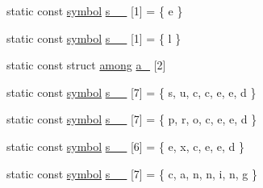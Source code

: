 \begin{DoxyCompactItemize}
static const \mbox{\hyperlink{namespaceirk_1_1porter2_afd04c4eb58a1dabcf8f3ab2d7e9f9ed5}{symbol}} \mbox{\hyperlink{namespaceirk_1_1porter2_a11dd59c08c3cf44465ad15ff372e47f8}{s\+\_\+\_}} \mbox{[}1\mbox{]} = \{ \textquotesingle{}e\textquotesingle{} \}
\item 
static const \mbox{\hyperlink{namespaceirk_1_1porter2_afd04c4eb58a1dabcf8f3ab2d7e9f9ed5}{symbol}} \mbox{\hyperlink{namespaceirk_1_1porter2_a5963461ea33ac29931deefcfee6eb61d}{s\+\_\+\_}} \mbox{[}1\mbox{]} = \{ \textquotesingle{}l\textquotesingle{} \}
\item 
static const struct \mbox{\hyperlink{structirk_1_1porter2_1_1among}{among}} \mbox{\hyperlink{namespaceirk_1_1porter2_a0a300713e83c720e1791ad3bb440cd5c}{a\+\_}} \mbox{[}2\mbox{]}
\item 
static const \mbox{\hyperlink{namespaceirk_1_1porter2_afd04c4eb58a1dabcf8f3ab2d7e9f9ed5}{symbol}} \mbox{\hyperlink{namespaceirk_1_1porter2_abc7eb2cc1e44236d34d4df82a63ae9b8}{s\+\_\+\_}} \mbox{[}7\mbox{]} = \{ \textquotesingle{}s\textquotesingle{}, \textquotesingle{}u\textquotesingle{}, \textquotesingle{}c\textquotesingle{}, \textquotesingle{}c\textquotesingle{}, \textquotesingle{}e\textquotesingle{}, \textquotesingle{}e\textquotesingle{}, \textquotesingle{}d\textquotesingle{} \}
\item 
static const \mbox{\hyperlink{namespaceirk_1_1porter2_afd04c4eb58a1dabcf8f3ab2d7e9f9ed5}{symbol}} \mbox{\hyperlink{namespaceirk_1_1porter2_a9181c7bd92b52358dbd82932858d4859}{s\+\_\+\_}} \mbox{[}7\mbox{]} = \{ \textquotesingle{}p\textquotesingle{}, \textquotesingle{}r\textquotesingle{}, \textquotesingle{}o\textquotesingle{}, \textquotesingle{}c\textquotesingle{}, \textquotesingle{}e\textquotesingle{}, \textquotesingle{}e\textquotesingle{}, \textquotesingle{}d\textquotesingle{} \}
\item 
static const \mbox{\hyperlink{namespaceirk_1_1porter2_afd04c4eb58a1dabcf8f3ab2d7e9f9ed5}{symbol}} \mbox{\hyperlink{namespaceirk_1_1porter2_a8bd82e00fa91a26ec105506548ae6f6a}{s\+\_\+\_}} \mbox{[}6\mbox{]} = \{ \textquotesingle{}e\textquotesingle{}, \textquotesingle{}x\textquotesingle{}, \textquotesingle{}c\textquotesingle{}, \textquotesingle{}e\textquotesingle{}, \textquotesingle{}e\textquotesingle{}, \textquotesingle{}d\textquotesingle{} \}
\item 
static const \mbox{\hyperlink{namespaceirk_1_1porter2_afd04c4eb58a1dabcf8f3ab2d7e9f9ed5}{symbol}} \mbox{\hyperlink{namespaceirk_1_1porter2_a90edb93a0d0bcb648a498387b1ffcbf8}{s\+\_\+\_}} \mbox{[}7\mbox{]} = \{ \textquotesingle{}c\textquotesingle{}, \textquotesingle{}a\textquotesingle{}, \textquotesingle{}n\textquotesingle{}, \textquotesingle{}n\textquotesingle{}, \textquotesingle{}i\textquotesingle{}, \textquotesingle{}n\textquotesingle{}, \textquotesingle{}g\textquotesingle{} \}

\end{DoxyCompactItemize}
